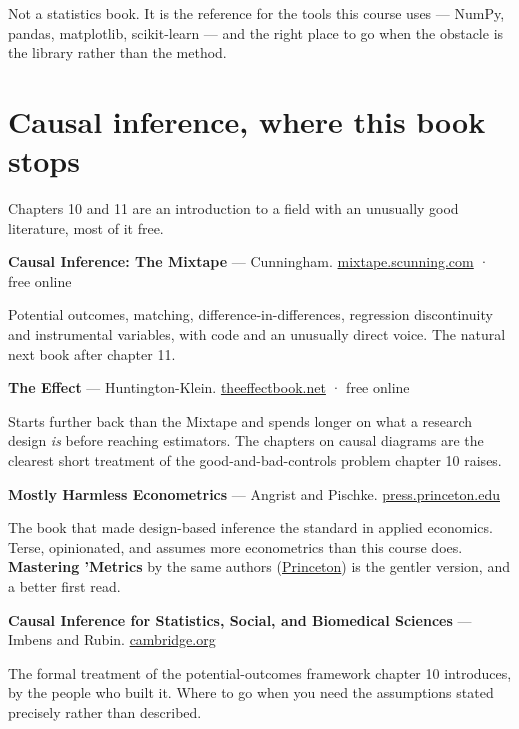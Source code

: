 \documentclass[
  letterpaper,
  10pt,
  twoside,
  openright,
  numbers=noenddot,
  chapterprefix=true]{scrbook}
\begin{document}
Not a statistics book. It is the reference for the tools this course
uses --- NumPy, pandas, matplotlib, scikit-learn --- and the right place
to go when the obstacle is the library rather than the method.

\section{Causal inference, where this book
stops}\label{causal-inference-where-this-book-stops}

Chapters 10 and 11 are an introduction to a field with an unusually good
literature, most of it free.

\textbf{Causal Inference: The Mixtape} --- Cunningham.
\href{https://mixtape.scunning.com/}{mixtape.scunning.com} · free online

Potential outcomes, matching, difference-in-differences, regression
discontinuity and instrumental variables, with code and an unusually
direct voice. The natural next book after chapter 11.

\textbf{The Effect} --- Huntington-Klein.
\href{https://theeffectbook.net/}{theeffectbook.net} · free online

Starts further back than the Mixtape and spends longer on what a
research design \emph{is} before reaching estimators. The chapters on
causal diagrams are the clearest short treatment of the
good-and-bad-controls problem chapter 10 raises.

\textbf{Mostly Harmless Econometrics} --- Angrist and Pischke.
\href{https://press.princeton.edu/books/paperback/9780691120355/mostly-harmless-econometrics}{press.princeton.edu}

The book that made design-based inference the standard in applied
economics. Terse, opinionated, and assumes more econometrics than this
course does. \textbf{Mastering 'Metrics} by the same authors
(\href{https://press.princeton.edu/books/paperback/9780691152844/mastering-metrics}{Princeton})
is the gentler version, and a better first read.

\textbf{Causal Inference for Statistics, Social, and Biomedical
Sciences} --- Imbens and Rubin.
\href{https://www.cambridge.org/core/books/causal-inference-for-statistics-social-and-biomedical-sciences/71126BE90C58F1A431FE9B2DD07938AB}{cambridge.org}

The formal treatment of the potential-outcomes framework chapter 10
introduces, by the people who built it. Where to go when you need the
assumptions stated precisely rather than described.
\end{document}
